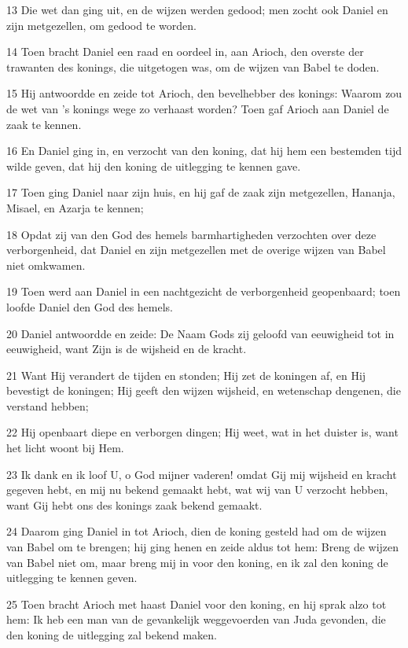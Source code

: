 \par 13 Die wet dan ging uit, en de wijzen werden gedood; men zocht ook Daniel en zijn metgezellen, om gedood te worden.
\par 14 Toen bracht Daniel een raad en oordeel in, aan Arioch, den overste der trawanten des konings, die uitgetogen was, om de wijzen van Babel te doden.
\par 15 Hij antwoordde en zeide tot Arioch, den bevelhebber des konings: Waarom zou de wet van 's konings wege zo verhaast worden? Toen gaf Arioch aan Daniel de zaak te kennen.
\par 16 En Daniel ging in, en verzocht van den koning, dat hij hem een bestemden tijd wilde geven, dat hij den koning de uitlegging te kennen gave.
\par 17 Toen ging Daniel naar zijn huis, en hij gaf de zaak zijn metgezellen, Hananja, Misael, en Azarja te kennen;
\par 18 Opdat zij van den God des hemels barmhartigheden verzochten over deze verborgenheid, dat Daniel en zijn metgezellen met de overige wijzen van Babel niet omkwamen.
\par 19 Toen werd aan Daniel in een nachtgezicht de verborgenheid geopenbaard; toen loofde Daniel den God des hemels.
\par 20 Daniel antwoordde en zeide: De Naam Gods zij geloofd van eeuwigheid tot in eeuwigheid, want Zijn is de wijsheid en de kracht.
\par 21 Want Hij verandert de tijden en stonden; Hij zet de koningen af, en Hij bevestigt de koningen; Hij geeft den wijzen wijsheid, en wetenschap dengenen, die verstand hebben;
\par 22 Hij openbaart diepe en verborgen dingen; Hij weet, wat in het duister is, want het licht woont bij Hem.
\par 23 Ik dank en ik loof U, o God mijner vaderen! omdat Gij mij wijsheid en kracht gegeven hebt, en mij nu bekend gemaakt hebt, wat wij van U verzocht hebben, want Gij hebt ons des konings zaak bekend gemaakt.
\par 24 Daarom ging Daniel in tot Arioch, dien de koning gesteld had om de wijzen van Babel om te brengen; hij ging henen en zeide aldus tot hem: Breng de wijzen van Babel niet om, maar breng mij in voor den koning, en ik zal den koning de uitlegging te kennen geven.
\par 25 Toen bracht Arioch met haast Daniel voor den koning, en hij sprak alzo tot hem: Ik heb een man van de gevankelijk weggevoerden van Juda gevonden, die den koning de uitlegging zal bekend maken.
